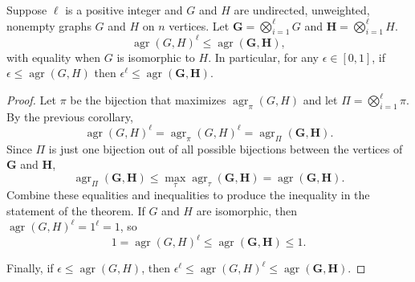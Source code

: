 \documentclass{article}
\newcommand{\1}{\mathbf{1}}
\DeclareMathOperator{\agr}{agr}
\begin{document}

\begin{theorem}
  Suppose $\ell$ is a positive integer and $G$ and $H$ are undirected, unweighted, nonempty graphs $G$ and $H$ on $n$ vertices.
  Let $\mathbf{G} = \bigotimes_{i = 1}^\ell G$ and $\mathbf{H} = \bigotimes_{i = 1}^\ell H$.
  \begin{equation*}
    \agr(G, H)^\ell \leq \agr(\mathbf{G}, \mathbf{H}),
  \end{equation*}
  with equality when $G$ is isomorphic to $H$.
  In particular, for any $\epsilon \in [0, 1]$, if $\epsilon \leq \agr(G, H)$ then $\epsilon^\ell \leq \agr(\mathbf{G}, \mathbf{H})$.
\end{theorem}
\begin{proof}
  Let $\pi$ be the bijection that maximizes $\agr_\pi(G, H)$ and let $\Pi = \bigotimes_{i = 1}^\ell \pi$.
  By the previous corollary,
  \begin{equation*}
    \agr(G, H)^\ell = \agr_\pi(G, H)^\ell = \agr_\Pi(\mathbf{G}, \mathbf{H}).
  \end{equation*}
  Since $\Pi$ is just one bijection out of all possible bijections between the vertices of $\mathbf{G}$ and $\mathbf{H}$,
  \begin{equation*}
    \agr_\Pi(\mathbf{G}, \mathbf{H}) \leq \max_\tau \agr_\tau(\mathbf{G}, \mathbf{H}) = \agr(\mathbf{G}, \mathbf{H}).
  \end{equation*}
  Combine these equalities and inequalities to produce the inequality in the statement of the theorem.
  If $G$ and $H$ are isomorphic, then $\agr(G, H)^\ell = 1^\ell = 1$, so
  \begin{equation*}
    1 = \agr(G, H)^\ell \leq \agr(\mathbf{G}, \mathbf{H}) \leq 1.
  \end{equation*}

  Finally, if $\epsilon \leq \agr(G, H)$, then $\epsilon^\ell \leq \agr(G, H)^\ell \leq \agr(\mathbf{G}, \mathbf{H})$.
\end{proof}
\end{document}
